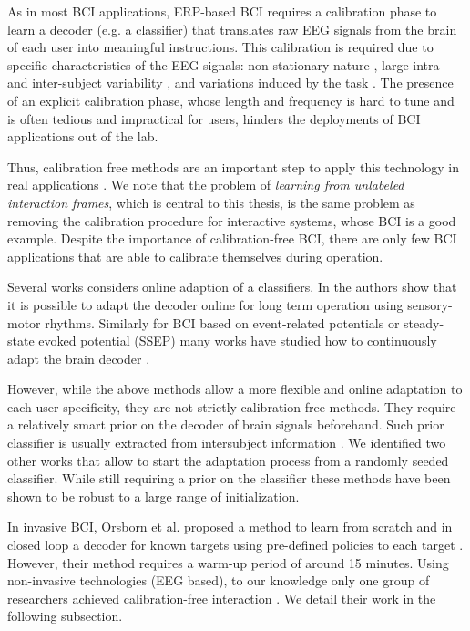 As in most BCI applications, ERP-based BCI requires a calibration phase to learn a decoder (e.g. a classifier) that translates raw EEG signals from the brain of each user into meaningful instructions. This calibration is required due to specific characteristics of the EEG signals: non-stationary nature \cite{vidaurre11}, large intra- and inter-subject variability \cite{Polich1997}, and variations induced by the task \cite{IturrateErrP13}. The presence of an explicit calibration phase, whose length and frequency is hard to tune and is often tedious and impractical for users, hinders the deployments of BCI applications out of the lab. 

Thus, calibration free methods are an important step to apply this technology in real applications \cite{millan10}. We note that the problem of \emph{learning from unlabeled interaction frames}, which is central to this thesis, is the same problem as removing the calibration procedure for interactive systems, whose BCI is a good example. Despite the importance of calibration-free BCI, there are only few BCI applications that are able to calibrate themselves during operation.

Several works considers online adaption of a classifiers. In \cite{vidaurre2010towards} the authors show that it is possible to adapt the decoder online for long term operation using sensory-motor rhythms. Similarly for BCI based on
event-related potentials or steady-state evoked potential (SSEP) many works have studied how to continuously adapt the brain decoder \cite{fazli2009subject,lu2009unsupervised,fazli2011l1,congedo2013new,schettini2014self}.

However, while the above methods allow a more flexible and online adaptation to each user specificity, they are not strictly calibration-free methods. They require a relatively smart prior on the decoder of brain signals beforehand. Such prior classifier is usually extracted from intersubject information \cite{fazli2009subject,lu2009unsupervised,vidaurre2010towards}. We identified two other works that allow to start the adaptation process from a randomly seeded classifier. While still requiring a prior on the classifier these methods have been shown to be robust to a large range of initialization.

In invasive BCI, Orsborn et al. proposed a method to learn from scratch and in closed loop a decoder for known targets using pre-defined policies to each target \cite{Orsborn2012}
. However, their method requires a warm-up period of around 15 minutes. Using non-invasive technologies (EEG based), to our knowledge only one group of researchers achieved calibration-free interaction \cite{Kindermans2012a,kindermans2014true}. We detail their work in the following subsection.


